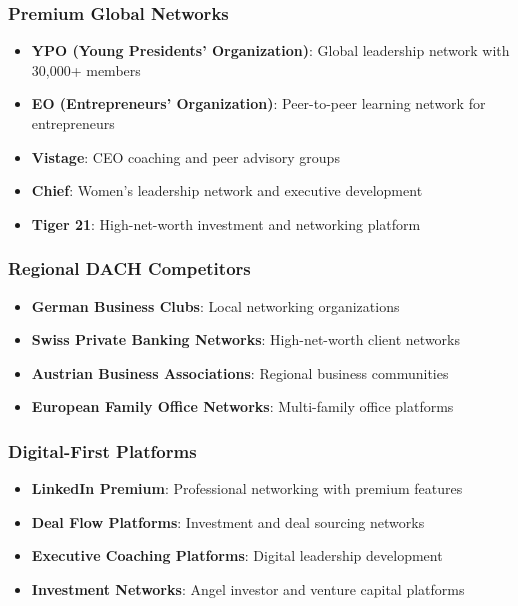 \subsubsection{Premium Global Networks}
\begin{itemize}
    \item \textbf{YPO (Young Presidents' Organization)}: Global leadership network with 30,000+ members
    \item \textbf{EO (Entrepreneurs' Organization)}: Peer-to-peer learning network for entrepreneurs
    \item \textbf{Vistage}: CEO coaching and peer advisory groups
    \item \textbf{Chief}: Women's leadership network and executive development
    \item \textbf{Tiger 21}: High-net-worth investment and networking platform
\end{itemize}

\subsubsection{Regional DACH Competitors}
\begin{itemize}
    \item \textbf{German Business Clubs}: Local networking organizations
    \item \textbf{Swiss Private Banking Networks}: High-net-worth client networks
    \item \textbf{Austrian Business Associations}: Regional business communities
    \item \textbf{European Family Office Networks}: Multi-family office platforms
\end{itemize}

\subsubsection{Digital-First Platforms}
\begin{itemize}
    \item \textbf{LinkedIn Premium}: Professional networking with premium features
    \item \textbf{Deal Flow Platforms}: Investment and deal sourcing networks
    \item \textbf{Executive Coaching Platforms}: Digital leadership development
    \item \textbf{Investment Networks}: Angel investor and venture capital platforms
\end{itemize}

